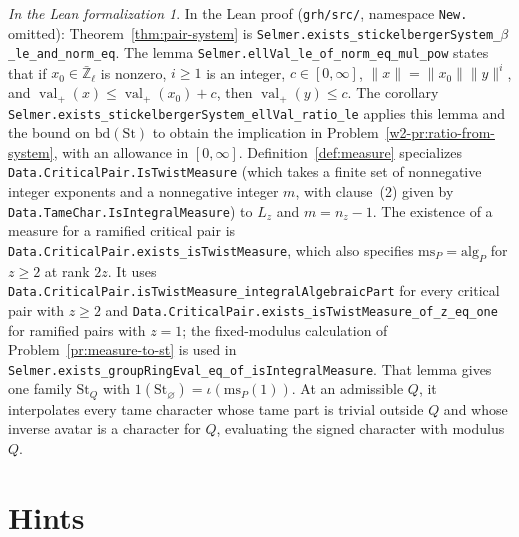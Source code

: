 \documentclass[reqno]{amsart}
\theoremstyle{definition}
\theoremstyle{plain}
\theoremstyle{remark}
\newtheorem*{leanremark}{In the Lean formalization}
\newcommand{\Zl}{\bar{\mathbb{Z}}_\ell}
\newcommand{\St}{\mathrm{St}}
\newcommand{\bd}{\mathrm{bd}}
\newcommand{\ms}{\mathrm{ms}}
\newcommand{\alg}{\mathrm{alg}}
\newcommand{\val}{\operatorname{val}}
\newcommand{\tl}[1]{\texttt{#1}}
\begin{document}
\begin{leanremark}
\raggedright In the Lean proof \cite{GL} (\tl{grh/src/}, namespace \tl{New.} omitted): Theorem~\ref{thm:pair-system} is \tl{Selmer.exists\_stickelbergerSystem\_}\(\beta\)\tl{\_le\_and\_norm\_eq}.  The lemma \tl{Selmer.ellVal\_le\_of\_norm\_eq\_mul\_pow} states that if \(x_0 \in \Zl\) is nonzero, \(i \ge 1\) is an integer, \(c \in [0,\infty]\), \(\lVert x\rVert = \lVert x_0\rVert\lVert y\rVert^i\), and \(\val_+(x) \le \val_+(x_0) + c\), then \(\val_+(y) \le c\).  The corollary \tl{Selmer.exists\_stickelbergerSystem\_ellVal\_ratio\_le} applies this lemma and the bound on \(\bd(\St)\) to obtain the implication in Problem~\ref{w2-pr:ratio-from-system}, with an allowance in \([0,\infty]\).  Definition~\ref{def:measure} specializes \tl{Data.CriticalPair.IsTwistMeasure} (which takes a finite set of nonnegative integer exponents and a nonnegative integer \(m\), with clause~(2) given by \tl{Data.TameChar.IsIntegralMeasure}) to \(L_z\) and \(m = n_z - 1\).  The existence of a measure for a ramified critical pair is \tl{Data.CriticalPair.exists\_isTwistMeasure}, which also specifies \(\ms_P = \alg_P\) for \(z \ge 2\) at rank \(2z\).  It uses \tl{Data.CriticalPair.isTwistMeasure\_integralAlgebraicPart} for every critical pair with \(z \ge 2\) and \tl{Data.CriticalPair.exists\_isTwistMeasure\_of\_z\_eq\_one} for ramified pairs with \(z = 1\); the fixed-modulus calculation of Problem~\ref{pr:measure-to-st} is used in \tl{Selmer.exists\_groupRingEval\_eq\_of\_isIntegralMeasure}.  That lemma gives one family \(\St_Q\) with \(1(\St_\varnothing) = \iota(\ms_P(1))\).  At an admissible \(Q\), it interpolates every tame character whose tame part is trivial outside \(Q\) and whose inverse avatar is a character for \(Q\), evaluating the signed character with modulus \(Q\).
\end{leanremark}

\section*{Hints}
\end{document}
